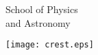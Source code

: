 \makeatletter
\begin{titlepage}
\begin{minipage}[b]{0.8\textwidth}
        {\Huge School of Physics\\ and Astronomy\\}
\end{minipage}
\hfill
\begin{minipage}[t]{40mm}
        \texttt{[image: crest.eps]}
\end{minipage}
\vspace*{4cm}

{\centering
{\LARGE\rmfamily\scshape \@title\\}
{\Huge{} \@subtitle\\}
\vspace{\fill}
{\Large \@author \\[1cm] \LARGE\bfseries \@date\\}
}
\end{titlepage}
\makeatother
